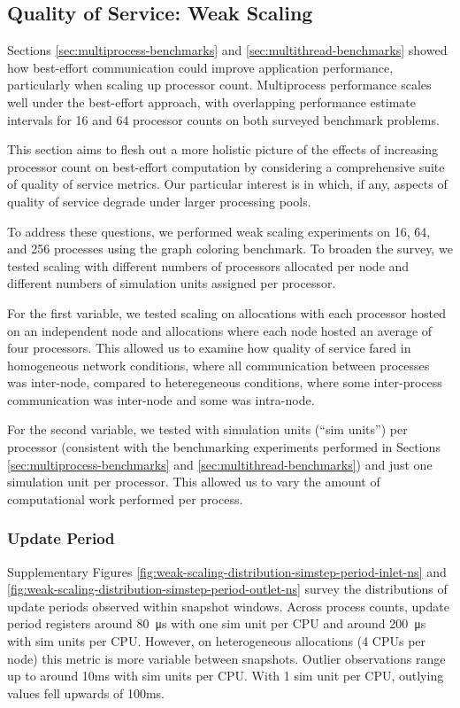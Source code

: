 \subsection{Quality of Service: Weak Scaling}
\label{sec:weak-scaling}

Sections \ref{sec:multiprocess-benchmarks} and \ref{sec:multithread-benchmarks} showed how best-effort communication could improve application performance, particularly when scaling up processor count.
Multiprocess performance scales well under the best-effort approach, with overlapping performance estimate intervals for 16 and 64 processor counts on both surveyed benchmark problems.

This section aims to flesh out a more holistic picture of the effects of increasing processor count on best-effort computation by considering a comprehensive suite of quality of service metrics.
Our particular interest is in which, if any, aspects of quality of service degrade under larger processing pools.

To address these questions, we performed weak scaling experiments on 16, 64, and 256 processes using the graph coloring benchmark.
To broaden the survey, we tested scaling with different numbers of processors allocated per node and different numbers of simulation units assigned per processor.

For the first variable, we tested scaling on allocations with each processor hosted on an independent node and allocations where each node hosted an average of four processors.
This allowed us to examine how quality of service fared in homogeneous network conditions, where all communication between processes was inter-node, compared to heteregeneous conditions, where some inter-process communication was inter-node and some was intra-node.

For the second variable, we tested with  simulation units (``sim units'') per processor (consistent with the benchmarking experiments performed in Sections \ref{sec:multiprocess-benchmarks} and \ref{sec:multithread-benchmarks}) and just one simulation unit per processor.
This allowed us to vary the amount of computational work performed per process.

\subsubsection{Update Period}

Supplementary Figures \ref{fig:weak-scaling-distribution-simstep-period-inlet-ns} and \ref{fig:weak-scaling-distribution-simstep-period-outlet-ns} survey the distributions of update periods observed within snapshot windows.
Across process counts, update period registers around \SI{80}{\micro\second} with one sim unit per CPU and around \SI{200}{\micro\second} with  sim units per CPU.
However, on heterogeneous allocations (4 CPUs per node) this metric is more variable between snapshots.
Outlier observations range up to around 10ms with  sim units per CPU.
With 1 sim unit per CPU, outlying values fell upwards of 100ms.

